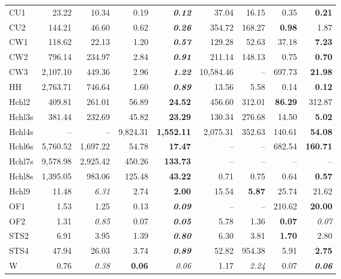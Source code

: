 \documentclass[9pt]{entcs}
\begin{document}
\begin{table}[ht]
\begin{tabular}{@{\extracolsep{4pt}}lrrrrrrrr@{}}
CU1 & 23.22 & 10.34 & 0.19 & \textbf{\textit{0.12}} & 37.04 & 16.15 & 0.35 & \textbf{0.21} \\
CU2 & 144.21 & 46.60 & 0.62 & \textbf{\textit{0.26}} & 354.72 & 168.27 & \textbf{0.98} & 1.87 \\
CW1 & 118.62 & 22.13 & 1.20 & \textbf{\textit{0.57}} & 129.28 & 52.63 & 37.18 & \textbf{7.23} \\
CW2 & 796.14 & 234.97 & 2.84 & \textbf{\textit{0.91}} & 211.14 & 148.13 & 0.75 & \textbf{0.70} \\
CW3 & 2,107.10 & 449.36 & 2.96 & \textbf{\textit{1.22}} & 10,584.46 & -- & 697.73 & \textbf{21.98} \\
HH & 2,763.71 & 746.64 & 1.60 & \textbf{\textit{0.89}} & 13.56 & 5.58 & 0.14 & \textbf{0.12} \\
Hchl2 & 409.81 & 261.01 & 56.89 & \textbf{24.52} & 456.60 & 312.01 & \textbf{86.29} & 312.87 \\
Hchl3s & 381.44 & 232.69 & 45.82 & \textbf{23.29} & 130.34 & 276.68 & 14.50 & \textbf{5.02} \\
Hchl4s & -- & -- & 9,824.31 & \textbf{1,552.11} & 2,075.31 & 352.63 & 140.61 & \textbf{54.08} \\
Hchl6s & 5,760.52 & 1,697.22 & 54.78 & \textbf{17.47} & -- & -- & 682.54 & \textbf{160.71} \\
Hchl7s & 9,578.98 & 2,925.42 & 450.26 & \textbf{133.73} & -- & -- & -- & -- \\
Hchl8s & 1,395.05 & 983.06 & 125.48 & \textbf{43.22} & 0.71 & 0.75 & 0.64 & \textbf{0.57} \\
Hchl9 & 11.48 & \textit{6.31} & 2.74 & \textbf{2.00} & 15.54 & \textbf{5.87} & 25.74 & 21.62 \\
OF1 & 1.53 & 1.25 & 0.13 & \textbf{\textit{0.09}} & -- & -- & 210.62 & \textbf{20.00} \\
OF2 & 1.31 & \textit{0.85} & 0.07 & \textbf{\textit{0.05}} & 5.78 & 1.36 & \textbf{0.07} & \textit{0.07} \\
STS2 & 6.91 & 3.95 & 1.39 & \textbf{\textit{0.80}} & 6.30 & 3.81 & \textbf{1.70} & 2.80 \\
STS4 & 47.94 & 26.03 & 3.74 & \textbf{\textit{0.89}} & 52.82 & 954.38 & 5.91 & \textbf{2.75} \\
W & 0.76 & \textit{0.38} & \textbf{0.06} & \textit{0.06} & 1.17 & \textit{2.24} & 0.07 & \textbf{\textit{0.06}} \\\hline\hline
\end{tabular}
\label{tab:comparison}
\end{table}
\end{document}
